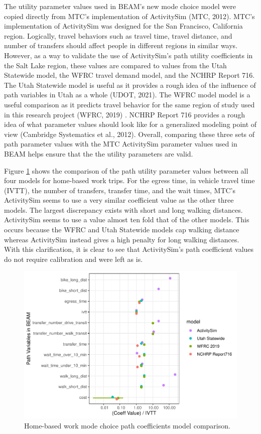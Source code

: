 \documentclass[fancy, masters]{byuthesis}
\begin{document}
The utility parameter values used in BEAM's new mode choice model were copied directly from MTC's implementation of ActivitySim (MTC, 2012). MTC's implementation of ActivitySim was designed for the San Francisco, California region. Logically, travel behaviors such as travel time, travel distance, and number of transfers should affect people in different regions in similar ways. However, as a way to validate the use of ActivitySim's path utility coefficients in the Salt Lake region, these values are compared to values from the Utah Statewide model, the WFRC travel demand model, and the NCHRP Report 716. The Utah Statewide model is useful as it provides a rough idea of the influence of path variables in Utah as a whole (UDOT, 2021). The WFRC model model is a useful comparison as it predicts travel behavior for the same region of study used in this research project (WFRC, 2019) . NCHRP Report 716 provides a rough idea of what parameter values should look like for a generalized modeling point of view (Cambridge Systematics et al., 2012). Overall, comparing these three sets of path parameter values with the MTC ActivitySim parameter values used in BEAM helps ensure that the the utility parameters are valid.

Figure \ref{fig:hbw} shows the comparison of the path utility parameter values between all four models for home-based work trips. For the egress time, in vehicle travel time (IVTT), the number of transfers, transfer time, and the wait times, MTC's ActivitySim seems to use a very similar coefficient value as the other three models. The largest discrepancy exists with short and long walking distances. ActivitySim seems to use a value almost ten fold that of the other models. This occurs because the WFRC and Utah Statewide models cap walking distance whereas ActivitySim instead gives a high penalty for long walking distances. With this clarification, it is clear to see that ActivitySim's path coefficient values do not require calibration and were left as is.

\begin{figure}

{\centering \includegraphics{thesis_files/figure-latex/hbw-1} 

}

\caption{Home-based work mode choice path coefficients model comparison.}\label{fig:hbw}
\end{figure}
\end{document}
